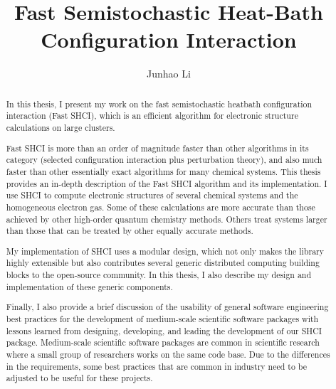 \documentclass[phd,tocprelim]{cornell}
\title {Fast Semistochastic Heat-Bath Configuration Interaction}
\author {Junhao Li}
\begin{document}
\maketitle
\makecopyright

\begin{abstract}
In this thesis, I present my work on the fast semistochastic heatbath configuration interaction (Fast SHCI), which is an efficient algorithm for electronic structure calculations on large clusters.

Fast SHCI is more than an order of magnitude faster than other algorithms in its category (selected configuration interaction plus perturbation theory), and also much faster than other essentially exact algorithms for many chemical systems.
This thesis provides an in-depth description of the Fast SHCI algorithm and its implementation. I use SHCI to compute electronic structures of several chemical systems and the homogeneous electron gas.
Some of these calculations are more accurate than those achieved by other high-order quantum chemistry methods.  Others treat systems larger than those that can be treated by other equally accurate methods.

My implementation of SHCI uses a modular design, which not only makes the library highly extensible but also contributes several generic distributed computing building blocks to the open-source community. 
In this thesis, I also describe my design and implementation of these generic components.

Finally, I also provide a brief discussion of the usability of general software engineering best practices for the development of medium-scale scientific software packages with lessons learned from designing, developing, and leading the development of our SHCI package.
Medium-scale scientific software packages are common in scientific research where a small group of researchers works on the same code base.
Due to the differences in the requirements, some best practices that are common in industry need to be adjusted to be useful for these projects.

\end{abstract}
\end{document}
